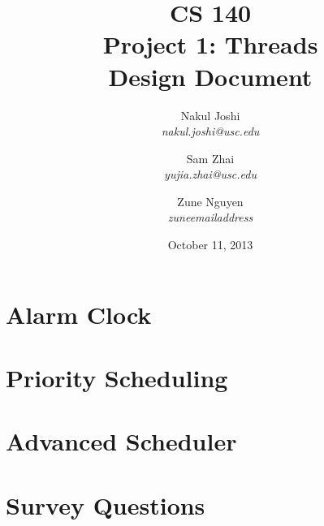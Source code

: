 \documentclass[titlepage]{article}
\title{CS 140\\Project 1: Threads\\Design Document}
\author{
	Nakul Joshi\\ \textit{nakul.joshi@usc.edu}\and
	Sam Zhai\\ \textit{yujia.zhai@usc.edu}\and
	Zune Nguyen\\ \textit{zuneemailaddress}
	}
\date{October 11, 2013}
\begin{document}
\maketitle
\tableofcontents
\newpage

%	
\section{Alarm Clock}
	
\section{Priority Scheduling}
	
\section{Advanced Scheduler}
	
\section{Survey Questions}
	
\end{document}
